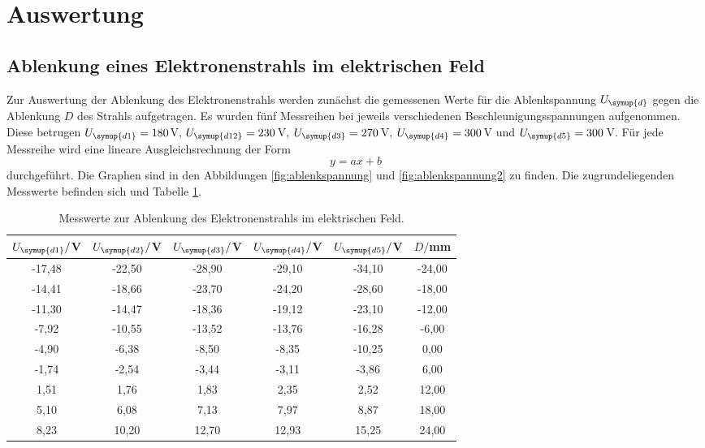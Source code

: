 \section{Auswertung}
\label{sec:Auswertung}


\subsection{Ablenkung eines Elektronenstrahls im elektrischen Feld}
\label{subsec:efeld}


Zur Auswertung der Ablenkung des Elektronenstrahls werden zunächst die gemessenen Werte
für die Ablenkspannung $U_{\symup{d}}$ gegen die Ablenkung $D$ des Strahls aufgetragen.
Es wurden fünf Messreihen bei jeweils verschiedenen Beschleunigungsspannungen aufgenommen.
Diese betrugen $U_{\symup{d1}}=180$V, $U_{\symup{d12}}=230\,$V, $U_{\symup{d3}}=270\,$V,
$U_{\symup{d4}}=300\,$V und $U_{\symup{d5}}=300\,$V.
Für jede Messreihe wird eine lineare Ausgleichsrechnung der Form
\begin{equation*}
  y=a x + b
\end{equation*}
durchgeführt. Die Graphen sind in den Abbildungen \ref{fig:ablenkspannung} und
\ref{fig:ablenkspannung2} zu finden. Die zugrundeliegenden Messwerte befinden sich
und Tabelle \ref{tab:elektrisch}.

\begin{table}[htp]
	\begin{center}
    \caption{Messwerte zur Ablenkung des Elektronenstrahls im elektrischen Feld.}
    \label{tab:elektrisch}
		\begin{tabular}{cccccc}
		\toprule
			{$U_{\symup{d1}}/$V} & {$U_{\symup{d2}}/$V} & {$U_{\symup{d3}}/$V} & {$U_{\symup{d4}}/$V} & {$U_{\symup{d5}}/$V} & {$D/$mm}\\
			\midrule
			-17,48 & -22,50 & -28,90 & -29,10 & -34,10 & -24,00\\
			-14,41 & -18,66 & -23,70 & -24,20 & -28,60 & -18,00\\
			-11,30 & -14,47 & -18,36 & -19,12 & -23,10 & -12,00\\
			-7,92 & -10,55 & -13,52 & -13,76 & -16,28 & -6,00\\
			-4,90 & -6,38 & -8,50 & -8,35 & -10,25 & 0,00\\
			-1,74 & -2,54 & -3,44 & -3,11 & -3,86 & 6,00\\
			1,51 & 1,76 & 1,83 & 2,35 & 2,52 & 12,00\\
			5,10 & 6,08 & 7,13 & 7,97 & 8,87 & 18,00\\
			8,23 & 10,20 & 12,70 & 12,93 & 15,25 & 24,00\\
		\bottomrule
		\end{tabular}
	\end{center}
\end{table}

